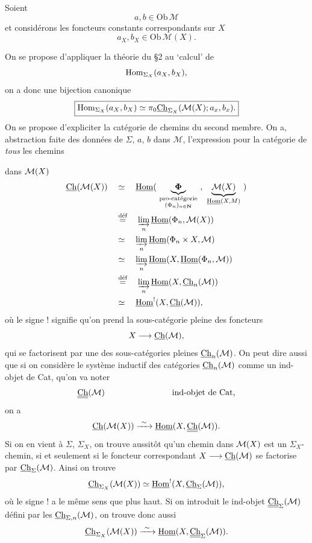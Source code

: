Soient
\[
a, b \in \mathrm{Ob}\,\mathcal{M}
\]
et considérons les foncteurs constants correspondants sur $X$
\[
a_X, b_X \in \mathrm{Ob}\,\mathcal{M}(X).
\]

On se propose d'appliquer la théorie du \S2 au `calcul' de
\[
\mathrm{Hom}_{\Sigma_X}(a_X, b_X),
\]
on a donc une bijection canonique
\[
\boxed{\Hom_{\Sigma_X}(a_X, b_X) \simeq \pi_0\uCh_{\Sigma_X}(\mathcal{M}(X); a_x, b_x).} %
\]
On se propose d'expliciter la catégorie de chemins du second membre. On a, abstraction faite des données de $\Sigma$, $a$, $b$ dans $\mathcal{M}$, l'expression pour la catégorie de \textit{tous} les chemins


dans $\mathcal{M}(X)$
\[
\begin{aligned}
\Ch(\cM(X)) \quad &\simeq \quad \uHom(\ \underbrace{\boldsymbol{\Phi}}_{\substack{\text{pro-catégorie}\\ (\Phi_n)_{n\in\mathbf{N}}}}\ ,\ \underbrace{\cM(X)}_{\uHom(X,M)}\ ) \\ %
&\dfeq \quad \varinjlim_n \uHom(\Phi_n,\cM(X)) \\
&\simeq \quad \varinjlim_n \uHom(\Phi_n\times X,\cM) \\
&\simeq \quad \varinjlim_n \uHom(X,\uHom(\Phi_n,\cM)) \\
&\dfeq \quad \varinjlim_n \uHom(X,\Ch_n(\cM)) \\
&\simeq \quad \uHom^{!}(X,\Ch(\cM)),
\end{aligned}
\]
où le signe ! signifie qu'on prend la sous-catégorie pleine des foncteurs
\[
X\longrightarrow \underline{\mathrm{Ch}}(\mathcal{M}),
\]
qui se factorisent par une des sous-catégories pleines $\underline{\mathrm{Ch}}_n(\mathcal{M})$. On peut dire aussi que si on considère le système inductif des catégories $\underline{\mathrm{Ch}}_n(\mathcal{M})$ comme un ind-objet de Cat, qu'on va noter
\[
\underline{\underline{\mathrm{Ch}}}(\mathcal{M}) \qquad\qquad\qquad\qquad \text{ind-objet de Cat,}
\]
on a
\[
\underline{\mathrm{Ch}}(\mathcal{M}(X)) \xrightarrow{\ \sim\ } \underline{\mathrm{Hom}}(X,\underline{\underline{\mathrm{Ch}}}(\mathcal{M})).
\]
Si on en vient à $\Sigma$, $\Sigma_X$, on trouve aussitôt qu'un chemin dans $\mathcal{M}(X)$ est un $\Sigma_X$-chemin, si et seulement si le foncteur correspondant $X\longrightarrow\underline{\mathrm{Ch}}(\mathcal{M})$ se factorise par $\underline{\mathrm{Ch}}_{\Sigma}(\mathcal{M})$. Ainsi on trouve
\[
\underline{\mathrm{Ch}}_{\Sigma_X}(\mathcal{M}(X))\simeq\underline{\mathrm{Hom}}^{!}(X,\underline{\mathrm{Ch}}_{\Sigma}(\mathcal{M})),
\]
où le signe ! a le même sens que plus haut. Si on introduit le ind-objet $\underline{\underline{\mathrm{Ch}}}_{\Sigma}(\mathcal{M})$ défini par les $\underline{\mathrm{Ch}}_{\Sigma,n}(\mathcal{M})$, on trouve donc aussi
\[
\underline{\mathrm{Ch}}_{\Sigma_X}(\mathcal{M}(X))\xrightarrow{\ \sim\ }\underline{\mathrm{Hom}}(X,\underline{\underline{\mathrm{Ch}}}_{\Sigma}(\mathcal{M})).
\]

